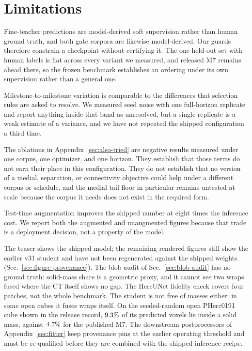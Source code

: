 \section{Limitations}
\label{sec:limitations}

Fine-teacher predictions are model-derived soft supervision rather than human
ground truth, and both gate corpora are likewise model-derived.
Our guards therefore constrain a checkpoint without certifying it.
The one held-out set with human labels is flat across every variant we
measured, and released M7 remains ahead there, so the frozen benchmark
establishes an ordering under its own supervision rather than a general one.

Milestone-to-milestone variation is comparable to the differences that
selection rules are asked to resolve.
We measured seed noise with one full-horizon replicate and report anything
inside that band as unresolved, but a single replicate is a weak estimate of a
variance, and we have not repeated the shipped configuration a third time.

The ablations in Appendix~\ref{sec:also-tried} are negative results measured
under one corpus, one optimizer, and one horizon.
They establish that those terms do not earn their place in this configuration.
They do not establish that no version of a medial, separation, or connectivity
objective could help under a different corpus or schedule, and the medial tail
floor in particular remains untested at scale because the corpus it needs does
not exist in the required form.

Test-time augmentation improves the shipped number at eight times the inference
cost.
We report both the augmented and unaugmented figures because that trade is a
deployment decision, not a property of the model.

The teaser shows the shipped model; the remaining rendered figures still show
the earlier v31 student and have not been regenerated against the shipped
weights (Sec.~\ref{sec:figure-provenance}).
The blob audit of Sec.~\ref{sec:blob-audit} has no ground truth: solid-mass
share is a geometric proxy, and it cannot see two wraps fused where the CT
itself shows no gap. The HercUNet fidelity check covers four patches, not the
whole benchmark.
The student is not free of masses either: in some open cubes it fuses wraps
itself.
On the seeded-random open PHerc0191 cube shown in the release record,
$9.3\%$ of its predicted voxels lie inside a solid mass, against
$4.7\%$ for the published M7.
The downstream postprocessors of Appendix~\ref{sec:fitter} keep provenance pins
at the earlier operating threshold and must be re-qualified before they are
combined with the shipped inference recipe.


